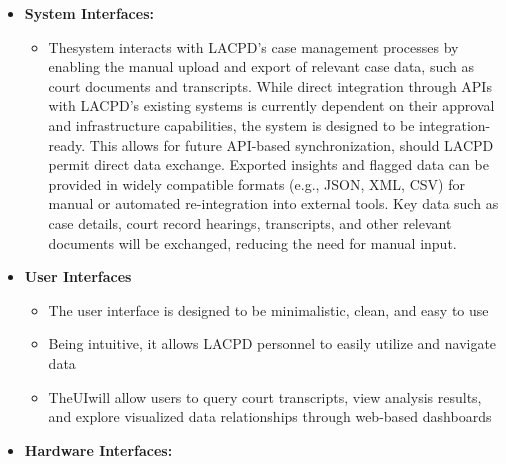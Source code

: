 \documentclass[12pt]{article}
\begin{document}
 
\begin{itemize}
    \item \textbf{System Interfaces:}
	\begin{itemize}
	 	\item   Thesystem interacts with LACPD's case management processes by enabling the manual
 upload and export of relevant case data, such as court documents and transcripts. While
 direct integration through APIs with LACPD’s existing systems is currently dependent on
 their approval and infrastructure capabilities, the system is designed to be
 integration-ready. This allows for future API-based synchronization, should LACPD
 permit direct data exchange. Exported insights and flagged data can be provided in
 widely compatible formats (e.g., JSON, XML, CSV) for manual or automated
 re-integration into external tools. Key data such as case details, court record hearings,
 transcripts, and other relevant documents will be exchanged, reducing the need for
 manual input.
	\end{itemize}
    \item \textbf{User Interfaces}
	\begin{itemize}
		 \item  The user interface is designed to be minimalistic, clean, and easy to use
		 \item  Being intuitive, it allows LACPD personnel to easily utilize and navigate data
 		\item TheUIwill allow users to query court transcripts, view analysis results, and explore
			 visualized data relationships through web-based dashboards
	\end{itemize}
    \item  \textbf{Hardware Interfaces:}
	\begin{itemize}


\end{itemize}
\end{itemize}
\end{document}
